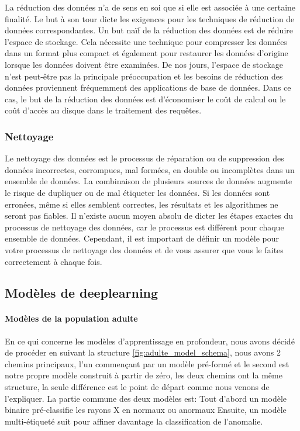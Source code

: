         La réduction des données n'a de sens en soi que si elle est associée à une certaine finalité. Le but à son tour dicte les exigences pour les techniques de réduction de données correspondantes. Un but naïf de la réduction des données est de réduire l'espace de stockage. Cela nécessite une technique pour compresser les données dans un format plus compact et également pour restaurer les données d'origine lorsque les données doivent être examinées. De nos jours, l'espace de stockage n'est peut-être pas la principale préoccupation et les besoins de réduction des données proviennent fréquemment des applications de base de données. Dans ce cas, le but de la réduction des données est d'économiser le coût de calcul ou le coût d'accès au disque dans le traitement des requêtes.
        \subsubsection{Nettoyage}
        Le nettoyage des données est le processus de réparation ou de suppression des données incorrectes, corrompues, mal formées, en double ou incomplètes dans un ensemble de données. La combinaison de plusieurs sources de données augmente le risque de dupliquer ou de mal étiqueter les données. Si les données sont erronées, même si elles semblent correctes, les résultats et les algorithmes ne seront pas fiables. Il n'existe aucun moyen absolu de dicter les étapes exactes du processus de nettoyage des données, car le processus est différent pour chaque ensemble de données. Cependant, il est important de définir un modèle pour votre processus de nettoyage des données et de vous assurer que vous le faites correctement à chaque fois.


   
    \subsection{Modèles de deeplearning}

    \paragraph*{Modèles de la population adulte} En ce qui concerne les modèles d'apprentissage en profondeur, nous avons décidé de procéder en suivant la structure \ref{fig:adulte_model_schema}, nous avons 2 chemins principaux, l'un commençant par un modèle pré-formé et le second est notre propre modèle construit à partir de zéro, les deux chemins ont la même structure, la seule différence est le point de départ comme nous venons de l'expliquer.
    La partie commune des deux modèles est:
    Tout d'abord un modèle binaire pré-classifie les rayons X en normaux ou anormaux
    Ensuite, un modèle multi-étiqueté suit pour affiner davantage la classification de l'anomalie.
